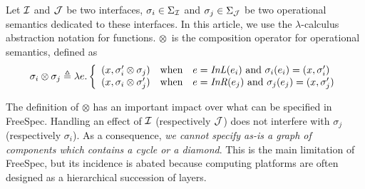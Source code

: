 \begin{definition} \label{def:freespec:semantics-composition} Let $\mathcal{I}$ and $\mathcal{J}$ be
  two interfaces, $\sigma_i \in \Sigma_{\mathcal{I}}$ and $\sigma_j \in \Sigma_{\mathcal{J}}$ be
  two operational semantics dedicated to these interfaces.
  In this article, we use the $\lambda$-calculus abstraction notation for
  functions. 
  $\otimes$~is the composition operator for operational semantics, defined as
  \[ \sigma_i \otimes \sigma_j \triangleq \lambda e. \left \{
      \begin{array}{lcl}
        (x, \sigma_i' \otimes \sigma_j) & \text{when} & e =
                                                        \mathit{InL}(e_i)
                                                        \text{ and }
                                                        \sigma_i(e_i)
                                                        = (x,
                                                        \sigma_i') \\
        (x, \sigma_i \otimes \sigma_j') & \text{when} & e =
                                                        \mathit{InR}(e_j)
                                                        \text{ and }
                                                        \sigma_j(e_j)
                                                        = (x, \sigma_j')
      \end{array}
    \right.
  \]
\end{definition}

The definition of $\otimes$ has an important impact over what can be specified in
FreeSpec.
%
%
Handling an effect of $\mathcal{I}$ (respectively $\mathcal{J}$) does not interfere  with
$\sigma_j$ (respectively $\sigma_i$).
%
As a consequence, \emph{we cannot specify as-is a graph of components which
  contains a cycle or a diamond}. 
%
This is the main limitation of FreeSpec, but its incidence is abated because
computing platforms are often designed as a hierarchical succession of layers.

